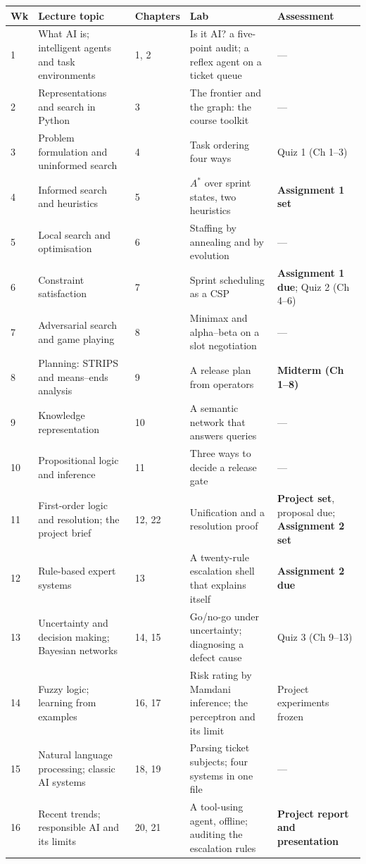 \begin{longtable}{@{}L{1.0cm}L{3.6cm}L{1.9cm}L{4.4cm}L{3.3cm}@{}}
\toprule
{}
\textbf{Wk} & \textbf{Lecture topic} & \textbf{Chapters} & \textbf{Lab} & \textbf{Assessment} \\
\midrule
{} & What AI is; intelligent agents and task environments & 1, 2 & Is it AI? a
five-point audit; a reflex agent on a ticket queue & --- \\
2 & Representations and search in Python & 3 & The frontier and the graph: the
course toolkit & --- \\
3 & Problem formulation and uninformed search & 4 & Task ordering four ways &
Quiz 1 (Ch 1--3) \\
4 & Informed search and heuristics & 5 & $A^{*}$ over sprint states, two
heuristics & \textbf{Assignment 1 set} \\
5 & Local search and optimisation & 6 & Staffing by annealing and by evolution &
--- \\
6 & Constraint satisfaction & 7 & Sprint scheduling as a CSP &
\textbf{Assignment 1 due}; Quiz 2 (Ch 4--6) \\
7 & Adversarial search and game playing & 8 & Minimax and alpha--beta on a slot
negotiation & --- \\
8 & Planning: STRIPS and means--ends analysis & 9 & A release plan from operators &
\textbf{Midterm (Ch 1--8)} \\
9 & Knowledge representation & 10 & A semantic network that answers queries & --- \\
10 & Propositional logic and inference & 11 & Three ways to decide a release gate &
--- \\
11 & First-order logic and resolution; the project brief & 12, 22 & Unification and
a resolution proof & \textbf{Project set}, proposal due; \textbf{Assignment 2 set} \\
12 & Rule-based expert systems & 13 & A twenty-rule escalation shell that explains
itself & \textbf{Assignment 2 due} \\
13 & Uncertainty and decision making; Bayesian networks & 14, 15 & Go/no-go under
uncertainty; diagnosing a defect cause & Quiz 3 (Ch 9--13) \\
14 & Fuzzy logic; learning from examples & 16, 17 & Risk rating by Mamdani
inference; the perceptron and its limit & Project experiments frozen \\
15 & Natural language processing; classic AI systems & 18, 19 & Parsing ticket
subjects; four systems in one file & --- \\
16 & Recent trends; responsible AI and its limits & 20, 21 & A tool-using agent,
offline; auditing the escalation rules &
\textbf{Project report and presentation} \\
\bottomrule
\end{longtable}

